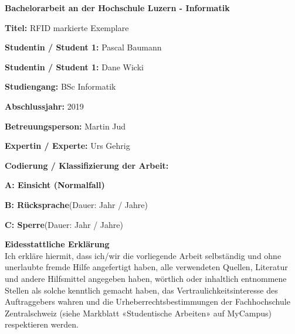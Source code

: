 \vspace*{1.35cm}

\noindent
\textbf{\Large{Bachelorarbeit an der Hochschule Luzern - Informatik}}

\vspace{0.6cm}
\noindent
\textbf{Titel:} RFID markierte Exemplare

\vspace{0.6cm}
\noindent
\textbf{Studentin / Student 1:} Pascal Baumann

\vspace{0.6cm}
\noindent
\textbf{Studentin / Student 1:} Dane Wicki

\vspace{1cm}
\noindent
\textbf{Studiengang:} BSc Informatik

\vspace{0.6cm}
\noindent
\textbf{Abschlussjahr:} 2019

\vspace{0.6cm}
\noindent
\textbf{Betreuungsperson:} Martin Jud

\vspace{0.6cm}
\noindent
\textbf{Expertin / Experte:} Urs Gehrig

\vspace{0.6cm}
\noindent
\textbf{Codierung / Klassifizierung der Arbeit:}

\begin{todolist}
	\item \textbf{A: Einsicht (Normalfall)}
	\item \textbf{B: Rücksprache}\hspace*{0.7cm}(Dauer:\hspace*{1cm} Jahr / Jahre)
	\item \textbf{C: Sperre}\hspace*{1.865cm}(Dauer:\hspace*{1cm} Jahr / Jahre)
\end{todolist}

\vfill

\noindent
\textbf{Eidesstattliche Erklärung}
\\
Ich erkläre hiermit, dass ich/wir die vorliegende Arbeit selbständig und ohne unerlaubte fremde Hilfe angefertigt haben, alle verwendeten Quellen, Literatur und andere Hilfsmittel angegeben haben, wörtlich oder inhaltlich entnommene Stellen als solche kenntlich gemacht haben, das Vertraulichkeitsinteresse des Auftraggebers wahren und die Urheberrechtsbestimmungen der Fachhochschule Zentralschweiz (siehe Markblatt «Studentische Arbeiten» auf MyCampus) respektieren werden.

